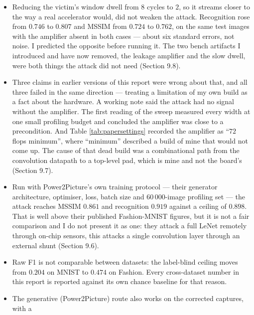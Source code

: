 \documentclass[11pt,a4paper]{article}
\begin{document}
\begin{itemize}
      shrinking the profiling set $37$ times costs, and either loss can be partly bought
      back with the other. For a defender that is the worse reading, because profiling
      traces are the cheap resource here (Sections 9.5 to 9.7).
\item Reducing the victim's window dwell from $8$ cycles to $2$, so it streams closer to
      the way a real accelerator would, did not weaken the attack. Recognition rose from
      $0.746$ to $0.807$ and MSSIM from $0.724$ to $0.762$, on the same test images with
      the amplifier absent in both cases --- about six standard errors, not noise. I
      predicted the opposite before running it. The two bench artifacts I introduced and
      have now removed, the leakage amplifier and the slow dwell, were both things the
      attack did not need (Section 9.8).
\item Three claims in earlier versions of this report were wrong about that, and all three
      failed in the same direction --- treating a limitation of my own build as a fact
      about the hardware. A working note said the attack had no signal without the
      amplifier. The first reading of the sweep measured every width at one small
      profiling budget and concluded the amplifier was close to a precondition. And
      Table \ref{tab:papersettings} recorded the amplifier as ``$72$ flops minimum'',
      where ``minimum'' described a build of mine that would not come up. The cause of
      that dead build was a combinational path from the convolution datapath to a
      top-level pad, which is mine and not the board's (Section 9.7).
\item Run with Power2Picture's own training protocol --- their generator architecture,
      optimiser, loss, batch size and $60\,000$-image profiling set --- the attack reaches
      MSSIM $0.861$ and recognition $0.919$ against a ceiling of $0.898$. That is well
      above their published Fashion-MNIST figures, but it is not a fair comparison and I
      do not present it as one: they attack a full LeNet remotely through on-chip sensors,
      this attacks a single convolution layer through an external shunt (Section 9.6).
\item Raw F1 is not comparable between datasets: the label-blind ceiling moves from
      $0.204$ on MNIST to $0.474$ on Fashion. Every cross-dataset number in this report
      is reported against its own chance baseline for that reason.
\item The generative (Power2Picture) route also works on the corrected captures, with a

\end{itemize}
\end{document}
